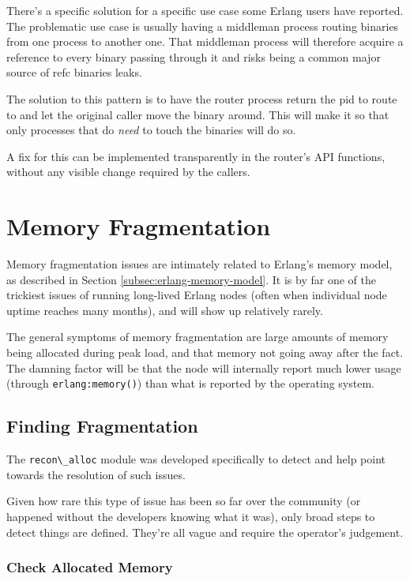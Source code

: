 \documentclass[11pt, oneside]{book}   	%
\newcommand{\module}[1]{\Verb`#1`}
\newcommand{\function}[1]{\Verb`#1`}
\begin{document}
There's a specific solution for a specific use case some Erlang users have reported. The problematic use case is usually having a middleman process routing binaries from one process to another one. That middleman process will therefore acquire a reference to every binary passing through it and risks being a common major source of refc binaries leaks.

The solution to this pattern is to have the router process return the pid to route to and let the original caller move the binary around. This will make it so that only processes that do \emph{need} to touch the binaries will do so.

A fix for this can be implemented transparently in the router's API functions, without any visible change required by the callers.

\section{Memory Fragmentation}
\label{sec:memory-fragmentation}

Memory fragmentation issues are intimately related to Erlang's memory model, as described in Section \ref{subsec:erlang-memory-model}. It is by far one of the trickiest issues of running long-lived Erlang nodes (often when individual node uptime reaches many months), and will show up relatively rarely.

The general symptoms of memory fragmentation are large amounts of memory being allocated during peak load, and that memory not going away after the fact. The damning factor will be that the node will internally report much lower usage (through \function{erlang:memory()}) than what is reported by the operating system.

\subsection{Finding Fragmentation}

The \module{recon\_alloc} module was developed specifically to detect and help point towards the resolution of such issues.

Given how rare this type of issue has been so far over the community (or happened without the developers knowing what it was), only broad steps to detect things are defined. They're all vague and require the operator's judgement.

\subsubsection{Check Allocated Memory}
\end{document}
